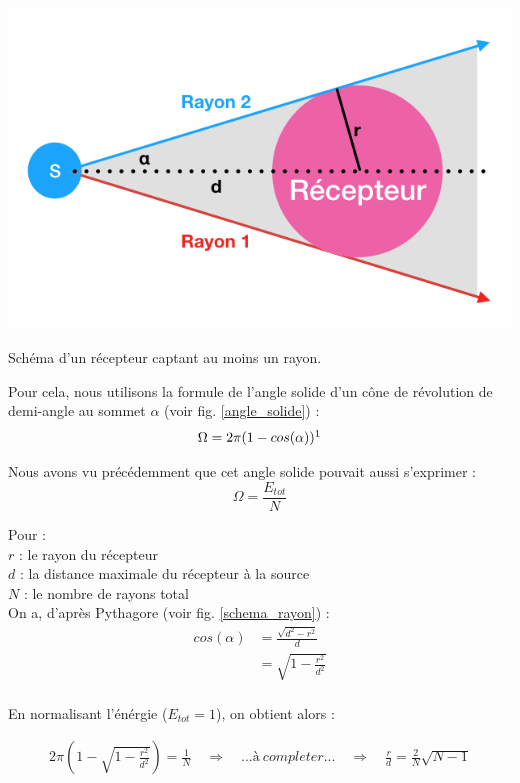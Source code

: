 \begin{figureth}
	\includegraphics[width=0.8\linewidth]{images/schema_rayon}
	\caption{Schéma d'un récepteur captant au moins un rayon.}
	\label{schema_rayon}
\end{figureth}

Pour cela, nous utilisons la formule de l'angle solide d'un cône de révolution de demi-angle au sommet $\alpha$ (voir fig. \ref{angle_solide}) :
\begin{equation}
	\Omega = 2\pi(1-cos(\alpha)) \footnotemark
\end{equation}

Nous avons vu précédemment que cet angle solide pouvait aussi s'exprimer :
\begin{equation}
	\Omega = \frac{E_{tot}}{N}
\end{equation}

Pour : \\
$r$ : le rayon du récepteur \\
$d$ : la distance maximale du récepteur à la source \\
$N$ : le nombre de rayons total \\

On a, d'après Pythagore (voir fig. \ref{schema_rayon}) :
\begin{align}
	cos(\alpha) & =  \frac{\sqrt{d^2-r^2}}{d}  \\
	& =  \sqrt{1-\frac{r^2}{d^2}} \\
\end{align}

En normalisant l'énérgie ($E_{tot} = 1$), on obtient alors :

\begin{align} 
	2\pi(1-\sqrt{1-\frac{r^2}{d^2}}) = \frac{1}{N} %
	 \quad \Rightarrow  \quad %
	 ... à \ completer ... %
	 \quad \Rightarrow  \quad %
	 \frac{r}{d} =  \frac{2}{N} \sqrt{N-1} \label{seuil_arret}
\end{align}


